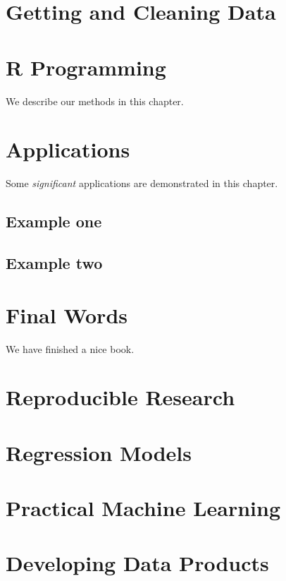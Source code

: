 \documentclass[
]{book}
\begin{document}
\hypertarget{getting-and-cleaning-data}{%
\chapter{Getting and Cleaning Data}\label{getting-and-cleaning-data}}

\hypertarget{r-programming}{%
\chapter{R Programming}\label{r-programming}}

We describe our methods in this chapter.

\hypertarget{applications}{%
\chapter{Applications}\label{applications}}

Some \emph{significant} applications are demonstrated in this chapter.

\hypertarget{example-one}{%
\section{Example one}\label{example-one}}

\hypertarget{example-two}{%
\section{Example two}\label{example-two}}

\hypertarget{final-words}{%
\chapter{Final Words}\label{final-words}}

We have finished a nice book.

\hypertarget{reproducible-research}{%
\chapter{Reproducible Research}\label{reproducible-research}}

\hypertarget{regression-models}{%
\chapter{Regression Models}\label{regression-models}}

\hypertarget{practical-machine-learning}{%
\chapter{Practical Machine Learning}\label{practical-machine-learning}}

\hypertarget{developing-data-products}{%
\chapter{Developing Data Products}\label{developing-data-products}}

  
\end{document}
